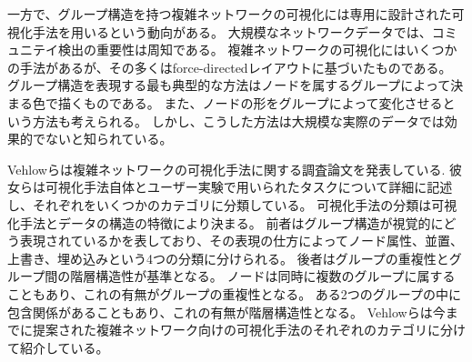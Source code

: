 \documentclass{kuee}
\begin{document}
一方で、グループ構造を持つ複雑ネットワークの可視化には専用に設計された可視化手法を用いるという動向がある。
大規模なネットワークデータでは、コミュニテイ検出の重要性は周知である。
複雑ネットワークの可視化にはいくつかの手法があるが、その多くはforce-directedレイアウトに基づいたものである。
グループ構造を表現する最も典型的な方法はノードを属するグループによって決まる色で描くものである\cite{mcpherson2005discovering}。
また、ノードの形をグループによって変化させるという方法も考えられる。
しかし、こうした方法は大規模な実際のデータでは効果的でないと知られている。

Vehlowらは複雑ネットワークの可視化手法に関する調査論文を発表している\cite{Vehlow2017VisualizingGS}.
彼女らは可視化手法自体とユーザー実験で用いられたタスクについて詳細に記述し、それぞれをいくつかのカテゴリに分類している。
可視化手法の分類は可視化手法とデータの構造の特徴により決まる。
前者はグループ構造が視覚的にどう表現されているかを表しており、その表現の仕方によってノード属性、並置、上書き、埋め込みという4つの分類に分けられる。
後者はグループの重複性とグループ間の階層構造性が基準となる。
ノードは同時に複数のグループに属することもあり、これの有無がグループの重複性となる。
ある2つのグループの中に包含関係があることもあり、これの有無が階層構造性となる。
Vehlowらは今までに提案された複雑ネットワーク向けの可視化手法のそれぞれのカテゴリに分けて紹介している。


\end{document}

